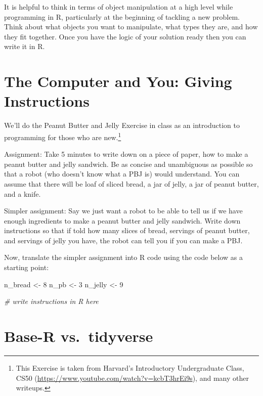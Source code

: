 \documentclass[]{book}
\newenvironment{Shaded}{\begin{snugshade}}{\end{snugshade}}
\newcommand{\DecValTok}[1]{\textcolor[rgb]{0.00,0.00,0.81}{#1}}
\newcommand{\StringTok}[1]{\textcolor[rgb]{0.31,0.60,0.02}{#1}}
\newcommand{\CommentTok}[1]{\textcolor[rgb]{0.56,0.35,0.01}{\textit{#1}}}
\newcommand{\NormalTok}[1]{#1}
\let\rmarkdownfootnote\footnote%
\def\footnote{\protect\rmarkdownfootnote}
\theoremstyle{definition}
\theoremstyle{definition}
\theoremstyle{definition}
\theoremstyle{remark}
\begin{document}
It is helpful to think in terms of object manipulation at a high level
while programming in R, particularly at the beginning of tackling a new
problem. Think about what objects you want to manipulate, what types
they are, and how they fit together. Once you have the logic of your
solution ready then you can write it in R.

\section{The Computer and You: Giving
Instructions}\label{the-computer-and-you-giving-instructions}

We'll do the Peanut Butter and Jelly Exercise in class as an
introduction to programming for those who are new.\footnote{This
  Exercise is taken from Harvard's Introductory Undergraduate Class,
  CS50 (\url{https://www.youtube.com/watch?v=kcbT3hrEi9s}), and many
  other writeups.}

Assignment: Take 5 minutes to write down on a piece of paper, how to
make a peanut butter and jelly sandwich. Be as concise and unambiguous
as possible so that a robot (who doesn't know what a PBJ is) would
understand. You can assume that there will be loaf of sliced bread, a
jar of jelly, a jar of peanut butter, and a knife.

Simpler assignment: Say we just want a robot to be able to tell us if we
have enough ingredients to make a peanut butter and jelly sandwich.
Write down instructions so that if told how many slices of bread,
servings of peanut butter, and servings of jelly you have, the robot can
tell you if you can make a PBJ.

Now, translate the simpler assignment into R code using the code below
as a starting point:

\begin{Shaded}
\begin{Highlighting}[]
\NormalTok{n_bread <-}\StringTok{ }\DecValTok{8}
\NormalTok{n_pb <-}\StringTok{ }\DecValTok{3}
\NormalTok{n_jelly <-}\StringTok{ }\DecValTok{9}

\CommentTok{# write instructions in R here}
\end{Highlighting}
\end{Shaded}

\section{Base-R vs.~tidyverse}\label{base-r-vs.tidyverse}
\end{document}
